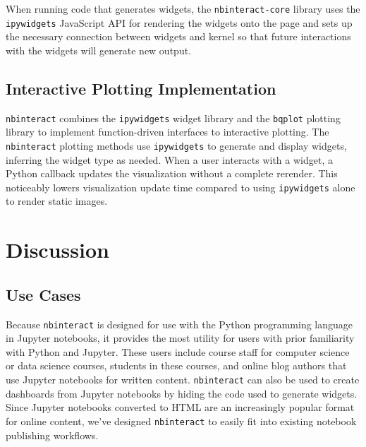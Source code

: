 \documentclass[nobib]{tufte-handout}
\newcommand{\code}[1]{\texttt{#1}}
\begin{document}
When running code that generates widgets, the \code{nbinteract-core} library
uses the \code{ipywidgets} JavaScript API for rendering the widgets onto the
page and sets up
the necessary connection between widgets and kernel so that future interactions
with the widgets will generate new output.


\subsection{Interactive Plotting Implementation} %
\label{sub:interactive_plotting_implementation}

\code{nbinteract} combines the \code{ipywidgets} widget library and the
\code{bqplot} plotting
library to implement function-driven interfaces to interactive plotting. The
\code{nbinteract} plotting methods use \code{ipywidgets} to generate and
display widgets, inferring the widget type as needed. When a user interacts
with a widget, a Python callback updates the visualization without a complete
rerender. This noticeably lowers visualization update time compared to using
\code{ipywidgets} alone to render static images.



\section{Discussion} %
\label{sec:discussion}

\subsection{Use Cases} %
\label{sub:use_cases}

Because \code{nbinteract} is designed for use with the Python programming
language in Jupyter notebooks, it provides the most utility for users with
prior familiarity with Python and Jupyter. These users include course staff for
computer science or data science courses, students in these courses, and online
blog authors that use Jupyter notebooks for written content. \code{nbinteract}
can also be used to create dashboards from Jupyter notebooks by hiding the
code used to generate widgets. Since Jupyter notebooks converted to HTML are an
increasingly popular format for online content, we've designed \code{nbinteract}
to easily fit into existing notebook publishing workflows.
\end{document}
